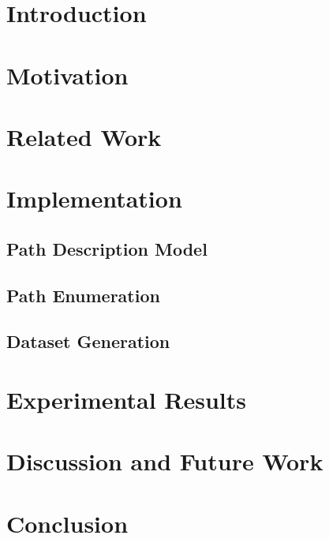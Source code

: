 \documentclass[12pt,journal,letterpaper,compsoc]{IEEEtran}
\begin{document}
\section{Introduction}
\label{sec:intro}

\section{Motivation}
\label{sec:motivation}

\section{Related Work}
\label{sec:bg}

\section{Implementation}
\label{sec:implementation}

\subsection{Path Description Model}
\subsection{Path Enumeration}
\subsection{Dataset Generation}


\section{Experimental Results}
\label{sec:results}

\section{Discussion and Future Work}
\label{sec:difficulties}

\section{Conclusion}
\label{sec:conc}

\end{document}
